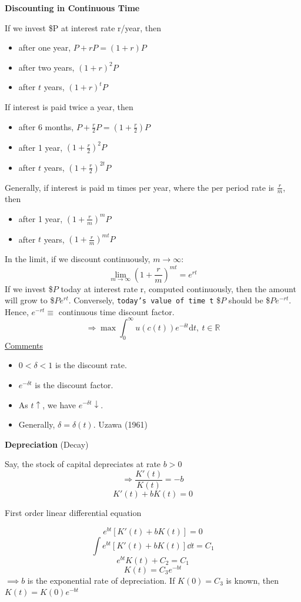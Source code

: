 \documentclass[twoside]{article}
\begin{document}
{\bf Discounting in Continuous Time}

If we invest \$P at interest rate r/year, then
\begin{itemize}
  \item after one year, $P + rP = (1+r)P$
  \item after two years, $(1+r)^2 P$
  \item after $t$ years, $(1+r)^t P$
\end{itemize}
If interest is paid twice a year, then
\begin{itemize}
  \item after 6 months, $P + \frac{r}{2}P = (1+\frac{r}{2})P$
  \item after 1 year,   $(1+\frac{r}{2})^2 P$
  \item after $t$ years, $(1+\frac{r}{2})^{2t} P$
\end{itemize}
Generally, if interest is paid m times per year, where the per period rate is $\frac{r}{m}$, then
\begin{itemize}
  \item after 1 year,   $(1+\frac{r}{m})^m P$
  \item after $t$ years, $(1+\frac{r}{m})^{mt} P$
\end{itemize}
In the limit, if we discount continuously, $m \longrightarrow \infty$:
\begin{equation}
  \lim_{m \rightarrow \infty} \left ( 1 + \frac{r}{m} \right )^{mt} = e^{rt}
\end{equation}
If we invest \$$P$ today at interest rate r, computed continuously, then the amount will grow to \$$Pe^{rt}$. Conversely, \texttt{today's value of time t} \$$P$ should be \$$Pe^{-rt}$. Hence, $e^{-rt} \equiv $ continuous time discount factor.
$$\Longrightarrow \max \int_{0}^\infty u(c(t)) e^{-\delta t} \mathrm{d}t, ~ t \in \mathbb{R}$$
\underline{Comments}
\begin{itemize}
  \item $0 < \delta < 1$ is the discount rate.
  \item $e^{- \delta t}$ is the discount factor.
  \item As $t \uparrow$, we have $e^{-\delta t} \downarrow$.
  \item Generally, $\delta = \delta(t)$. Uzawa (1961)
\end{itemize}

{\bf Depreciation} (Decay)

Say, the stock of capital depreciates at rate $b>0$
$$\Longrightarrow \frac{K'(t)}{K(t)} = -b$$
$$K'(t) + b K(t) = 0$$
\begin{center}
  First order linear differential equation
\end{center}
$$e^{bt}[K'(t)+bK(t)]=0$$
$$\int e^{bt}[K'(t)+bK(t)] \dd t  = C_1$$
$$e^{bt} K(t) +C_2 = C_1$$
$$K(t) = C_3 e^{-bt}$$
$\implies b$ is the exponential rate of depreciation. If $K(0) = C_3$ is known, then $K(t) = K(0)e^{-bt}$
\end{document}
